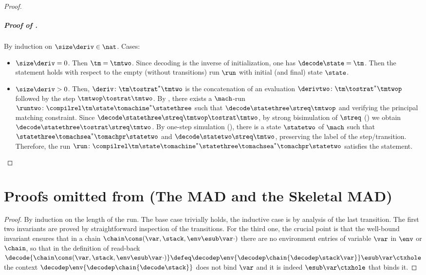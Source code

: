 \begin{proof}
  \subparagraph{Proof of .}  By induction on $\size\deriv \in \nat$. Cases:
  \begin{itemize}
  \item $\size\deriv = 0$. Then $\tm = \tmtwo$.
  Since decoding is the inverse of initialization, one has $\decode\state = \tm$.
  Then the statement holds with respect to the empty (\ie without transitions) run $\run$ with initial (and final) state $\state$.
  
 \item  $\size\deriv > 0$. Then, $\deriv\colon \tm \tostrat^* \tmtwo$ is the concatenation of an evaluation $\derivtwo \colon \tm \tostrat^* \tmtwop$ followed by the step $\tmtwop \tostrat \tmtwo$.
  By \ih, there exists a $\mach$-run $\runtwo\colon \compilrel\tm\state \tomachine^* \statethree$ such that $\decode\statethree \streq \tmtwop$ and verifying the principal matching constraint.
  Since $\decode\statethree \streq \tmtwop\tostrat \tmtwo$, by strong bisimulation of $\streq$ () we obtain $\decode\statethree \tostrat \streq\tmtwo$.
By one-step simulation (), there is a state $\statetwo$ of $\mach$ such that $\statethree \tomachsea^*\tomachpr \statetwo$ and $\decode\statetwo\streq \tmtwo$, preserving the label of the step/transition.
  Therefore, the run $\run \colon \compilrel\tm\state \tomachine^*\statethree \tomachsea^*\tomachpr \statetwo$ satisfies the statement.\qedhere
  \end{itemize}
\end{proof}


\section{Proofs omitted from  (The MAD and the Skeletal MAD)}
\label{sect:app-skeletal-MAD}


\begin{proof}
By induction on the length of the run. The base case trivially holds, the inductive case is by analysis of the last transition. The first two invariants are proved by straightforward inspection of the transitions. For the third one, the crucial point is that the well-bound invariant ensures that in a chain $\chain\cons(\var, \stack, \env\esub\var\cdot)$ there are no environment entries of variable $\var$ in $\env$ or $\chain$, so that in the definition of read-back $\decode{\chain\cons(\var, \stack, \env\esub\var\cdot)}	 \defeq  \decodep\env{\decodep\chain{\decodep\stack\var}}\esub\var\ctxhole$ the context $\decodep\env{\decodep\chain{\decode\stack}}$ does not bind $\var$ and it is indeed $\esub\var\ctxhole$ that binds it.
\end{proof}



